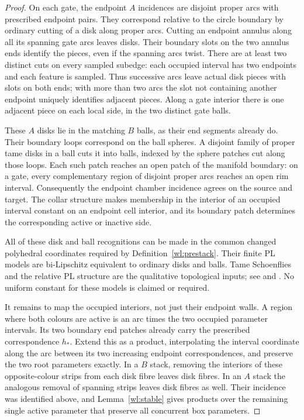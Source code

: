 \documentclass[11pt]{article}
\numberwithin{equation}{section}
\theoremstyle{definition}
\theoremstyle{remark}
\begin{document}
\begin{proof}
On each gate, the endpoint $A$ incidences are disjoint proper arcs
with prescribed endpoint pairs.  They correspond relative to the
circle boundary by ordinary cutting of a disk along proper arcs.
Cutting an endpoint annulus along all its spanning gate arcs leaves
disks.  Their boundary slots on the two annulus ends identify the
pieces, even if the spanning arcs twist.  There are at least two
distinct cuts on every sampled subedge: each occupied interval has
two endpoints and each feature is sampled.  Thus successive arcs
leave actual disk pieces with slots on both ends; with more than
two arcs the slot not containing another endpoint uniquely
identifies adjacent pieces.  Along a gate interior there is one
adjacent piece on each local side, in the two distinct gate balls.

These $A$ disks lie in the matching $B$ balls, as their end segments
already do.  Their boundary loops correspond on the ball spheres.
A disjoint family of proper tame disks in a ball cuts it into balls,
indexed by the sphere patches cut along those loops.  Each such
patch reaches an open patch of the manifold boundary: on a gate,
every complementary region of disjoint proper arcs reaches an open
rim interval.  Consequently the endpoint chamber incidence agrees
on the source and target.  The collar structure makes membership
in the interior of an occupied interval constant on an endpoint
cell interior, and its boundary patch determines the corresponding
active or inactive side.

All of these disk and ball recognitions can be made in the common
changed polyhedral coordinates required by
Definition~\ref{wl:prestack}.  Their finite PL models are
bi-Lipschitz equivalent to ordinary disks and balls.  Tame
Schoenflies and the relative PL structure are the qualitative
topological inputs; see \cite[Theorem~5]{Brown1960} and
\cite[Theorem~2.2]{Hamilton1976}.  No uniform constant for these
models is claimed or required.

It remains to map the occupied interiors, not just their endpoint
walls.  A region where both colours are active is an arc times the
two occupied parameter intervals.  Its two boundary end patches
already carry the prescribed correspondence $h_*$.  Extend this as
a product, interpolating the interval coordinate along the arc
between its two increasing endpoint correspondences, and preserve
the two root parameters exactly.  In a $B$ stack, removing the
interiors of these opposite-colour strips from each disk fibre
leaves disk fibres.  In an $A$ stack the analogous removal of
spanning strips leaves disk fibres as well.  Their incidence was
identified above, and Lemma~\ref{wl:stable} gives products over the
remaining single active parameter that preserve all concurrent
box parameters.


\end{proof}
\end{document}
